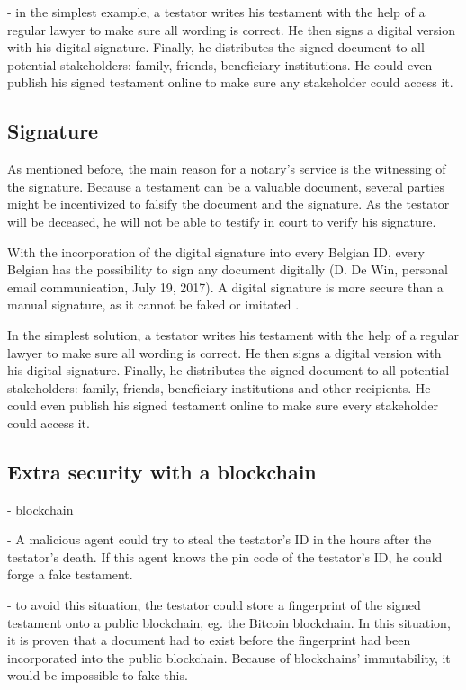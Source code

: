 - in the simplest example, a testator writes his testament with the help of a regular lawyer to make sure all wording is correct. He then signs a digital version with his digital signature. Finally, he distributes the signed document to all potential stakeholders: family, friends, beneficiary institutions. He could even publish his signed testament online to make sure any stakeholder could access it.
\fi

\subsection{Signature}

 As mentioned before, the main reason for a notary's service is the witnessing of the signature. Because a testament can be a valuable document, several parties might be incentivized to falsify the document and the signature. As the testator will be deceased, he will not be able to testify in court to verify his signature.

 With the incorporation of the digital signature into every Belgian ID, every Belgian has the possibility to sign any document digitally (D. De Win, personal email communication, July 19, 2017). A digital signature is more secure than a manual signature, as it cannot be faked or imitated \cite{belgian-eid}. 

 In the simplest solution, a testator writes his testament with the help of a regular lawyer to make sure all wording is correct. He then signs a digital version with his digital signature. Finally, he distributes the signed document to all potential stakeholders: family, friends, beneficiary institutions and other recipients. He could even publish his signed testament online to make sure every stakeholder could access it.


\subsection{Extra security with a blockchain}

\iffalse
- blockchain

- A malicious agent could try to steal the testator's ID in the hours after the testator's death. If this agent knows the pin code of the testator's ID, he could forge a fake testament.

- to avoid this situation, the testator could store a fingerprint of the signed testament onto a public blockchain, eg. the Bitcoin blockchain. In this situation, it is proven that a document had to exist before the fingerprint had been incorporated into the public blockchain. Because of blockchains' immutability, it would be impossible to fake this.

